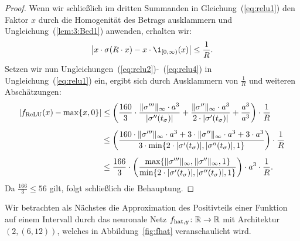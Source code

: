 \begin{proof}
Wenn wir schließlich im dritten Summanden in Gleichung~(\ref{eq:relu1}) den Faktor $x$ durch die Homogenität des Betrags ausklammern und Ungleichung~(\ref{lem:3:Bed1}) anwenden, erhalten wir:
\begin{equation}
\label{eq:relu4}
\big| x \cdot \sigma(R \cdot x) - x \cdot \1_{[0, \infty)}(x)\big| \leq \frac{1}{R}.
\end{equation}
Setzen wir nun Ungleichungen~(\ref{eq:relu2})-~(\ref{eq:relu4}) in Ungleichung~(\ref{eq:relu1}) ein, ergibt sich durch Ausklammern von $\frac{1}{R}$ und weiteren Abschätzungen:
\begin{equation*}
\begin{split}
|f_{\mathrm{ReLU}}(x) - \max\{x, 0\}| & \leq \bigg(\frac{160}{3} \cdot \frac{\|\sigma'''\|_{\infty} \cdot a ^3}{|\sigma''(t_{\sigma})|} + \frac{\|\sigma''\|_{\infty} \cdot a^3}{2 \cdot |\sigma'(t_{\sigma})|} + \frac{a^3}{a^3} \bigg) \cdot \frac{1}{R} \\[0.5em]
& \leq \bigg(\frac{160 \cdot\|\sigma'''\|_{\infty} \cdot a ^3 + 3 \cdot \|\sigma''\|_{\infty} \cdot a^3 + 3 \cdot a^3}{3 \cdot \min\{ 2 \cdot |\sigma'(t_{\sigma})|, |\sigma''(t_{\sigma})|, 1\}}\bigg) \cdot \frac{1}{R}\\[0.5em]
& \leq \frac{166}{3} \cdot \bigg(\frac{\max\{\|\sigma'''\|_{\infty}, \|\sigma''\|_{\infty} , 1\}}{\min\{ 2 \cdot |\sigma'(t_{\sigma})|, |\sigma''(t_{\sigma})|, 1\}}\bigg) \cdot a^3 \cdot  \frac{1}{R}.
\end{split}
\end{equation*}
Da $\frac{166}{3} \leq 56$ gilt, folgt schließlich die Behauptung.
  \end{proof}
Wir betrachten als Nächstes die Approximation des Positivteils einer Funktion auf einem Intervall durch das neuronale Netz $f_{\mathrm{hat},y}\colon \mathbb{R} \to \mathbb{R}$ mit Architektur $(2, (6, 12))$, welches in Abbildung~\ref{fig:fhat} veranschaulicht wird.
